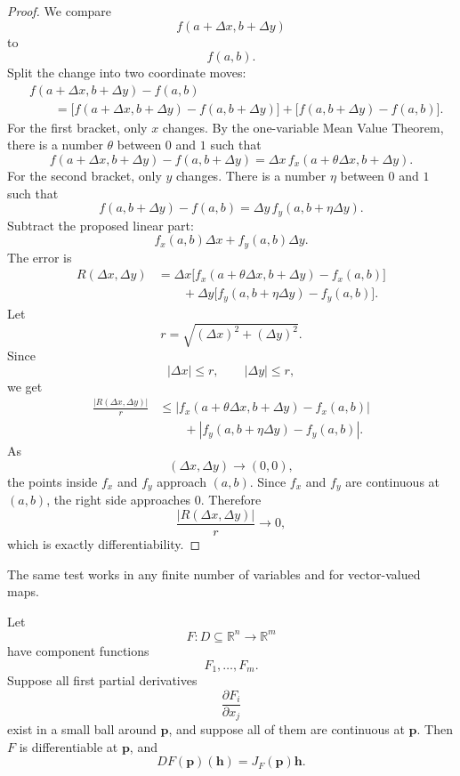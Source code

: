 \begin{proof}
We compare
\[
    f(a+\Delta x,b+\Delta y)
\]
to
\[
    f(a,b).
\]
Split the change into two coordinate moves:
\[
\begin{aligned}
&f(a+\Delta x,b+\Delta y)-f(a,b)\\
&\qquad =
\bigl[f(a+\Delta x,b+\Delta y)-f(a,b+\Delta y)\bigr]
+
\bigl[f(a,b+\Delta y)-f(a,b)\bigr].
\end{aligned}
\]
For the first bracket, only \(x\) changes.  By the one-variable Mean Value Theorem,
there is a number \(\theta\) between \(0\) and \(1\) such that
\[
    f(a+\Delta x,b+\Delta y)-f(a,b+\Delta y)
    =
    \Delta x\,
    f_x(a+\theta\Delta x,b+\Delta y).
\]
For the second bracket, only \(y\) changes.  There is a number \(\eta\) between
\(0\) and \(1\) such that
\[
    f(a,b+\Delta y)-f(a,b)
    =
    \Delta y\,
    f_y(a,b+\eta\Delta y).
\]
Subtract the proposed linear part:
\[
    f_x(a,b)\Delta x+f_y(a,b)\Delta y.
\]
The error is
\[
\begin{aligned}
R(\Delta x,\Delta y)
&=
\Delta x\bigl[
f_x(a+\theta\Delta x,b+\Delta y)-f_x(a,b)
\bigr]\\
&\qquad
+
\Delta y\bigl[
f_y(a,b+\eta\Delta y)-f_y(a,b)
\bigr].
\end{aligned}
\]
Let
\[
    r=\sqrt{(\Delta x)^2+(\Delta y)^2}.
\]
Since
\[
    |\Delta x|\le r,
    \qquad
    |\Delta y|\le r,
\]
we get
\[
\begin{aligned}
\frac{|R(\Delta x,\Delta y)|}{r}
&\le
\left|
f_x(a+\theta\Delta x,b+\Delta y)-f_x(a,b)
\right|\\
&\qquad+
\left|
f_y(a,b+\eta\Delta y)-f_y(a,b)
\right|.
\end{aligned}
\]
As
\[
    (\Delta x,\Delta y)\to(0,0),
\]
the points inside \(f_x\) and \(f_y\) approach \((a,b)\).  Since \(f_x\) and \(f_y\)
are continuous at \((a,b)\), the right side approaches \(0\).  Therefore
\[
    \frac{|R(\Delta x,\Delta y)|}{r}\to0,
\]
which is exactly differentiability.
\end{proof}

The same test works in any finite number of variables and for vector-valued maps.

\begin{theorem}
Let
\[
    F:D\subseteq\mathbb R^n\to\mathbb R^m
\]
have component functions
\[
    F_1,\ldots,F_m.
\]
Suppose all first partial derivatives
\[
    \frac{\partial F_i}{\partial x_j}
\]
exist in a small ball around \(\mathbf p\), and suppose all of them are continuous at
\(\mathbf p\).  Then \(F\) is differentiable at \(\mathbf p\), and
\[
\boxed{
    DF(\mathbf p)(\mathbf h)=J_F(\mathbf p)\mathbf h.
}
\]
\end{theorem}

